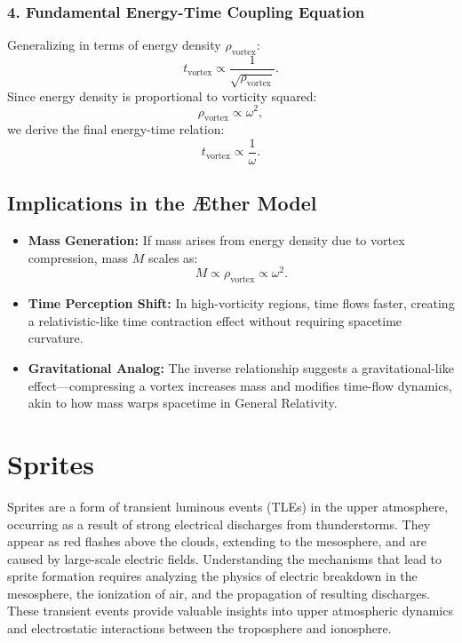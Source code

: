 \documentclass[a4paper,10pt]{article}
\begin{document}
    \subsubsection*{4. Fundamental Energy-Time Coupling Equation}
    Generalizing in terms of energy density $\rho_\text{vortex}$:
    \begin{equation*}
        t_\text{vortex} \propto \frac{1}{\sqrt{\rho_\text{vortex}}}.
    \end{equation*}
    Since energy density is proportional to vorticity squared:
    \begin{equation*}
        \rho_\text{vortex} \propto \omega^2,
    \end{equation*}
    we derive the final energy-time relation:
    \begin{equation*}
        t_\text{vortex} \propto \frac{1}{\omega}.
    \end{equation*}

    \subsection*{Implications in the Æther Model}
    \begin{itemize}
        \item \textbf{Mass Generation:} If mass arises from energy density due to vortex compression, mass $M$ scales as:
        \begin{equation*}
            M \propto \rho_\text{vortex} \propto \omega^2.
        \end{equation*}
        \item \textbf{Time Perception Shift:} In high-vorticity regions, time flows faster, creating a relativistic-like time contraction effect without requiring spacetime curvature.
        \item \textbf{Gravitational Analog:} The inverse relationship suggests a gravitational-like effect—compressing a vortex increases mass and modifies time-flow dynamics, akin to how mass warps spacetime in General Relativity.
    \end{itemize}

    
\section{Sprites}


Sprites are a form of transient luminous events (TLEs) in the upper atmosphere, occurring as a result of strong electrical discharges from thunderstorms. They appear as red flashes above the clouds, extending to the mesosphere, and are caused by large-scale electric fields. Understanding the mechanisms that lead to sprite formation requires analyzing the physics of electric breakdown in the mesosphere, the ionization of air, and the propagation of resulting discharges. These transient events provide valuable insights into upper atmospheric dynamics and electrostatic interactions between the troposphere and ionosphere.
\end{document}
